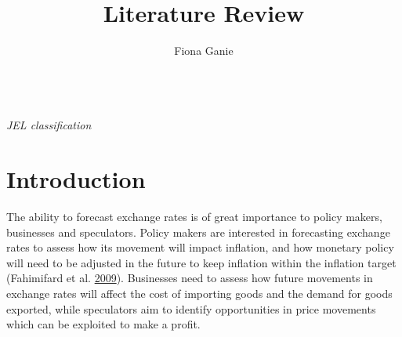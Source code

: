 \documentclass[12pt,preprint, authoryear]{elsarticle}
\numberwithin{equation}{section}
\numberwithin{figure}{section}
\numberwithin{table}{section}
\begin{document}
\begin{frontmatter}  %

\title{Literature Review}

\author[Add1]{Fiona Ganie}





\address[Add1]{University of Cape Town}



\vspace{1cm}

\begin{keyword}
\footnotesize{
 \\ \vspace{0.3cm}
\textit{JEL classification} 
}
\end{keyword}
\vspace{0.5cm}
\end{frontmatter}



\pagestyle{fancy}
\chead{}
\rhead{}
\lfoot{}
\lhead{}
\cfoot{}


\headsep 35pt %




\section{\texorpdfstring{Introduction
\label{Introduction}}{Introduction }}\label{introduction}

The ability to forecast exchange rates is of great importance to policy
makers, businesses and speculators. Policy makers are interested in
forecasting exchange rates to assess how its movement will impact
inflation, and how monetary policy will need to be adjusted in the
future to keep inflation within the inflation target (Fahimifard et al.
\protect\hyperlink{ref-fahimifard2009}{2009}). Businesses need to assess
how future movements in exchange rates will affect the cost of importing
goods and the demand for goods exported, while speculators aim to
identify opportunities in price movements which can be exploited to make
a profit.
\end{document}
